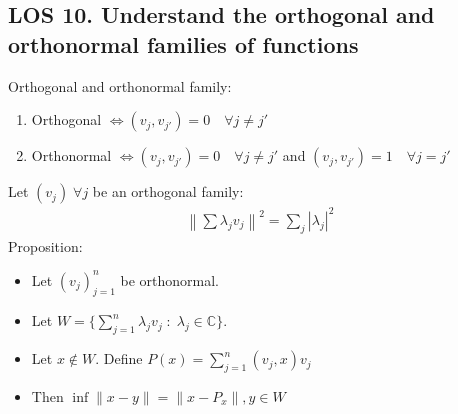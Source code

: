 \documentclass[12pt, a4paper]{article}
\begin{document}
\subsection*{LOS 10. Understand the orthogonal and orthonormal families of functions}
Orthogonal and orthonormal family:
\begin{enumerate}
    \item Orthogonal $\Leftrightarrow (v_j, v_{j'}) = 0\quad\forall j \ne j'$
    \item Orthonormal $\Leftrightarrow (v_j, v_{j'}) = 0\quad\forall j \ne j'$ and $(v_j, v_{j'}) = 1\quad\forall j = j'$ \\
\end{enumerate}
Let $(v_j)\;\forall j$ be an orthogonal family:
\begin{gather*}
    \left\|\sum \lambda_jv_j\right\|^2 = \sum_j|\lambda_j|^2
\end{gather*}
Proposition:
\begin{itemize}
    \item Let $(v_j)^n_{j=1}$ be orthonormal.
    \item Let $W = \{\sum_{j=1}^n\lambda_jv_j \; : \; \lambda_j \in \mathbb{C}\}$.
    \item Let $x\notin W$. Define $P(x) = \sum_{j=1}^{n}(v_j, x)v_j$
    \item Then $\inf \|x-y\| = \|x-P_x\|, y \in W$
\end{itemize}
\vspace{0.3em}
\end{document}
